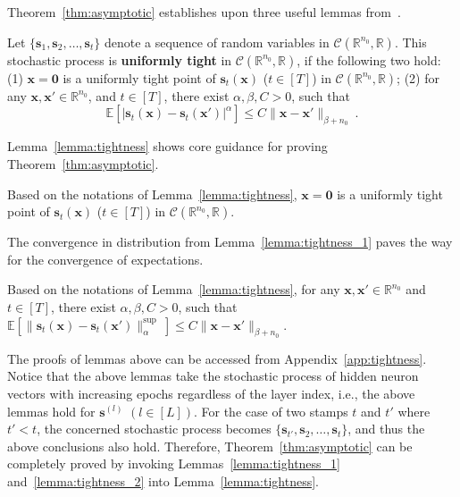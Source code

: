 \documentclass[review,10pt]{JMtemplate}
\begin{document}
Theorem~\ref{thm:asymptotic} establishes upon three useful lemmas from~\citep{zhang2022:NNGP}.
\begin{lemma} \label{lemma:tightness}
Let $\{\boldsymbol{s}_1, \boldsymbol{s}_2, \dots, \boldsymbol{s}_t\}$ denote a sequence of random variables in $\mathcal{C}(\mathbb{R}^{n_0},\mathbb{R})$. This stochastic process is \textbf{uniformly tight} in $\mathcal{C}(\mathbb{R}^{n_0},\mathbb{R})$, if the following two hold:
(1) $\boldsymbol{x}=\boldsymbol{0}$ is a uniformly tight point of $\boldsymbol{s}_t(\boldsymbol{x})$ ($t \in [T]$) in $\mathcal{C}(\mathbb{R}^{n_0},\mathbb{R})$; 
(2) for any $\boldsymbol{x}, \boldsymbol{x}' \in \mathbb{R}^{n_0}$, and $t \in [T]$, there exist $\alpha, \beta, C >0$, such that
\[
\mathbb{E} \left[ | \boldsymbol{s}_t(\boldsymbol{x}) - \boldsymbol{s}_t(\boldsymbol{x}') |^{\alpha} \right] \leq C \| \boldsymbol{x} - \boldsymbol{x}' \|_{\beta+n_0} \ .
\]
\end{lemma}
Lemma~\ref{lemma:tightness} shows core guidance for proving Theorem~\ref{thm:asymptotic}.
\begin{lemma} \label{lemma:tightness_1}
Based on the notations of Lemma~\ref{lemma:tightness}, $\boldsymbol{x}=\boldsymbol{0}$ is a uniformly tight point of $\boldsymbol{s}_t(\boldsymbol{x})$ ($t \in [T]$) in $\mathcal{C}(\mathbb{R}^{n_0},\mathbb{R})$.
\end{lemma}
The convergence in distribution from Lemma~\ref{lemma:tightness_1} paves the way for the convergence of expectations.
\begin{lemma} \label{lemma:tightness_2}
Based on the notations of Lemma~\ref{lemma:tightness}, for any $\boldsymbol{x}, \boldsymbol{x}' \in \mathbb{R}^{n_0}$ and $t \in [T]$, there exist $\alpha, \beta, C >0$, such that $\mathbb{E} \left[ \| \boldsymbol{s}_t(\boldsymbol{x}) - \boldsymbol{s}_t(\boldsymbol{x}') \|_{\alpha}^{\textrm{sup}} ~\right] \leq C \| \boldsymbol{x} - \boldsymbol{x}' \|_{\beta+n_0}$.
\end{lemma}
The proofs of lemmas above can be accessed from Appendix~\ref{app:tightness}. Notice that the above lemmas take the stochastic process of hidden neuron vectors with increasing epochs regardless of the layer index, i.e., the above lemmas hold for $\boldsymbol{s}^{(l)}$ $(l\in[L])$. For the case of two stamps $t$ and $t'$ where $t'<t$, the concerned stochastic process becomes $\{\boldsymbol{s}_{t'}, \boldsymbol{s}_2, \dots, \boldsymbol{s}_t\}$, and thus the above conclusions also hold. Therefore, Theorem~\ref{thm:asymptotic} can be completely proved by invoking Lemmas~\ref{lemma:tightness_1} and~\ref{lemma:tightness_2} into Lemma~\ref{lemma:tightness}. 
\end{document}
